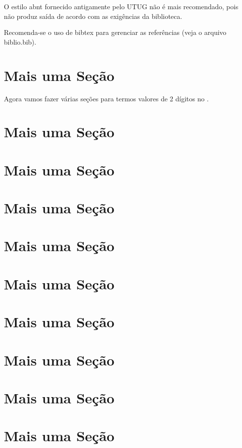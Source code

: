 \documentclass[cic,tc,english]{iiufrgs}
\begin{document}
O estilo abnt fornecido antigamente pelo UTUG não é mais recomendado, pois não
produz saída de acordo com as exigências da biblioteca.

Recomenda-se o uso de bibtex para gerenciar as referências (veja o arquivo
biblio.bib).

\section{Mais uma Seção}

Agora vamos fazer várias seções para termos valores de 2 dígitos no \contentsname.

\section{Mais uma Seção}
\section{Mais uma Seção}
\section{Mais uma Seção}
\section{Mais uma Seção}
\section{Mais uma Seção}
\section{Mais uma Seção}
\section{Mais uma Seção}
\section{Mais uma Seção}
\section{Mais uma Seção}
\end{document}
